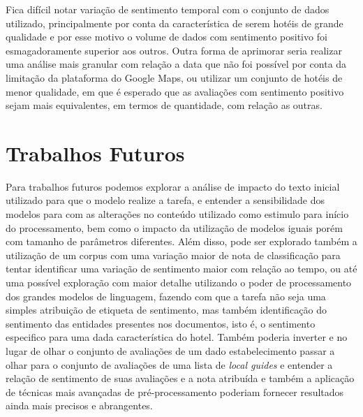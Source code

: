 Fica difícil notar variação de sentimento temporal com o conjunto de dados utilizado, principalmente por conta da característica de serem hotéis de grande qualidade e por esse motivo o volume de dados com sentimento positivo foi esmagadoramente superior aos outros. Outra forma de aprimorar seria realizar uma análise mais granular com relação a data que não foi possível por conta da limitação da plataforma do Google Maps, ou utilizar um conjunto de hotéis de menor qualidade, em que é esperado que as avaliações com sentimento positivo sejam mais equivalentes, em termos de quantidade, com relação as outras.

\section{Trabalhos Futuros}
\label{cap:conclusao:sec:trab_futuros}

Para trabalhos futuros podemos explorar a análise de impacto do texto inicial utilizado para que o modelo realize a tarefa, e entender a sensibilidade dos modelos para com as alterações no conteúdo utilizado como estimulo para início do processamento, bem como o impacto da utilização de modelos iguais porém com tamanho de parâmetros diferentes. Além disso, pode ser explorado também a utilização de um corpus com uma variação maior de nota de classificação para tentar identificar uma variação de sentimento maior com relação ao tempo, ou até uma possível exploração com maior detalhe utilizando o poder de processamento dos grandes modelos de linguagem, fazendo com que a tarefa não seja uma simples atribuição de etiqueta de sentimento, mas também identificação do sentimento das entidades presentes nos documentos, isto é, o sentimento especifico para uma dada característica do hotel. Também poderia inverter e no lugar de olhar o conjunto de avaliações de um dado estabelecimento passar a olhar para o conjunto de avaliações de uma lista de \textit{local guides} e entender a relação de sentimento de suas avaliações e a nota atribuída e também a aplicação de técnicas mais avançadas de pré-processamento poderiam fornecer resultados ainda mais precisos e abrangentes.

